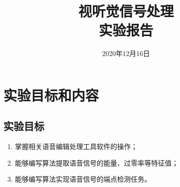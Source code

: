 \documentclass{hitreport}
\title{视听觉信号处理\\实验报告}
\date{2020年12月16日}
\begin{document}
\maketitle

\tableofcontents
\newpage




\section{实验目标和内容}

\subsection{实验目标}
\begin{enumerate}
\item 掌握相关语音编辑处理工具软件的操作；
\item 能够编写算法提取语音信号的能量、过零率等特征值；
\item 能够编写算法实现语音信号的端点检测任务。
\end{enumerate}
\end{document}
